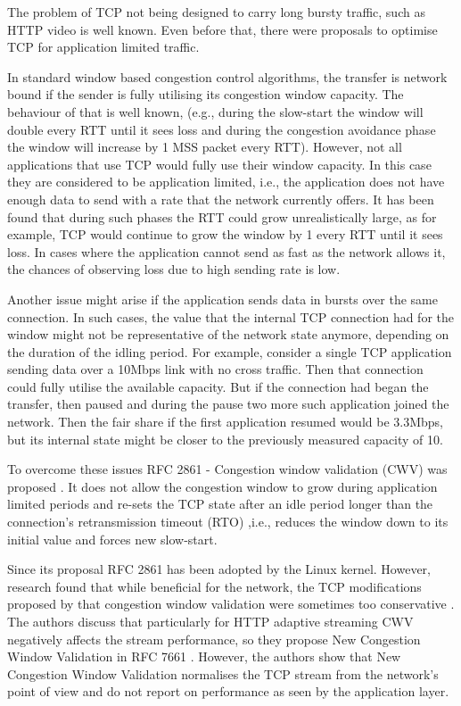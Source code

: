 \documentclass[10pt,sigconf]{acmart}
\begin{document}
The problem of TCP not being designed to carry long bursty traffic, such as HTTP video is well known. Even before that, there were proposals to optimise TCP for application limited traffic.

In standard window based congestion control algorithms, the transfer is network bound if the sender is fully utilising its congestion window capacity. The behaviour of that is well known, (e.g., during the slow-start the window will double every RTT until it sees loss and during the congestion avoidance phase the window will increase by 1 MSS packet every RTT). However, not all applications that use TCP would fully use their window capacity. In this case they are considered to be application limited, i.e., the application does not have enough data to send with a rate that the network currently offers. It has been found that during such phases the RTT could grow unrealistically large, as for example, TCP would continue to grow the window by 1 every RTT until it sees loss. In cases where the application cannot send as fast as the network allows it, the chances of observing loss due to high sending rate is low.

Another issue might arise if the application sends data in bursts over the same connection. In such cases, the value that the internal TCP connection had for the window might not be representative of the network state anymore, depending on the duration of the idling period. For example, consider a single TCP application sending data over a 10Mbps link with no cross traffic. Then that connection could fully utilise the available capacity. But if the connection had began the transfer, then paused and during the pause two more such application joined the network. Then the fair share if the first application resumed would be 3.3Mbps, but its internal state might be closer to the previously measured capacity of 10.

To overcome these issues RFC 2861 - Congestion window validation (CWV) was proposed \cite{rfc2861-2000-padhye-congestion-window-validation}. It does not allow the congestion window to grow during application limited periods and re-sets the TCP state after an idle period longer than the connection's retransmission timeout (RTO) ,i.e., reduces the window down to its initial value and forces new slow-start.

Since its proposal RFC 2861 has been adopted by the Linux kernel. However, research found that while beneficial for the network, the TCP modifications proposed by that congestion window validation were sometimes too conservative \cite{Nazir-2014-performance-evaluation-congestion-window-validation-dash-newcwv}. The authors discuss that particularly for HTTP adaptive streaming CWV negatively affects the stream performance, so they propose New Congestion Window Validation in RFC 7661 \cite{rfc7661-2015-fairhurst-new-cwnd-validation}. However, the authors show that New Congestion Window Validation normalises the TCP stream from the network's point of view and do not report on performance as seen by the application layer.
\end{document}
